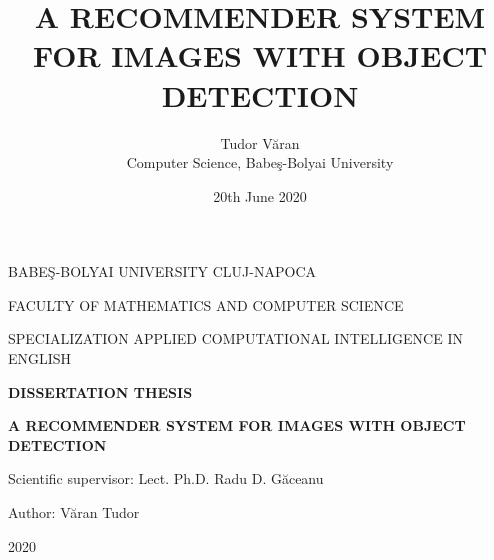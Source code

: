 \documentclass[a4paper, 12pt]{report}
\title{A RECOMMENDER SYSTEM FOR IMAGES WITH OBJECT DETECTION}
\date{20th June 2020}
\author{Tudor V\u aran\\ Computer Science, Babe\c s-Bolyai University}
\begin{document}
\pagestyle{headings}

\begin{titlepage}
\sloppy
\begin{center}
\Large{BABE\c{S}-BOLYAI UNIVERSITY CLUJ-NAPOCA} 

\Large{FACULTY OF MATHEMATICS AND COMPUTER SCIENCE} 

\Large{SPECIALIZATION APPLIED COMPUTATIONAL INTELLIGENCE IN ENGLISH}

\vspace{4cm}
\Large \textbf{DISSERTATION THESIS}

\vspace{1.3cm}
\Huge \textbf{A RECOMMENDER SYSTEM FOR IMAGES WITH OBJECT DETECTION}
\end{center}
\vspace{3cm}

\begin{flushleft}
    \Large{Scientific supervisor: Lect. Ph.D. Radu D. G\u{a}ceanu}
\end{flushleft}
\vspace{1cm}

\begin{flushright}
    \Large{Author: V\u{a}ran Tudor}
\end{flushright}

\vspace{1cm}
\begin{center}
\Large{2020}
\end{center}
\end{titlepage}
\end{document}

